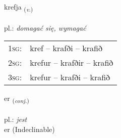\documentclass[frontgrid, backgrid]{flacards}\usepackage[]{graphicx}\usepackage[]{xcolor}
\begin{document}
\renewcommand{\flhead}{\vskip5pt \fboxsep=0pt {\small\bfseries\footnotesize Sagnorð | czasownik}}
\renewcommand{\fcfoot}{\vskip5pt \fboxsep=0pt \hspace{2pt}{\small\bfseries\footnotesize 1K}}

\renewcommand{\blhead}{\vskip5pt {\small\bfseries\footnotesize Sagnorð | czasownik }}
\renewcommand{\bcfoot}{\vskip5pt \hspace{2pt}{\small\bfseries\footnotesize 1K}}


{krefja \small{\textsubscript{(\textit{v.})}} \\[1ex] %
\textphonetic{[kʰrɛvja]} \\
pl.: \emph{domagać się, wymagać} \\  [2ex]
\renewcommand*{\arraystretch}{0.8}
\begin{tabular}{p{1cm}l}
\textsc{1sg}: & kref -- krafði -- krafið \\ 
\textsc{2sg}: & krefur -- krafðir -- krafið \\ 
\textsc{3sg}: & krefur -- krafði -- krafið \\ 
\end{tabular}
}


\renewcommand{\flhead}{\vskip5pt \fboxsep=0pt {\small\bfseries\footnotesize Samtenging | spójnik}}
\renewcommand{\fcfoot}{\vskip5pt \fboxsep=0pt \hspace{2pt}{\small\bfseries\footnotesize 1K}}

\renewcommand{\blhead}{\vskip5pt {\small\bfseries\footnotesize Samtenging | spójnik }}
\renewcommand{\bcfoot}{\vskip5pt \hspace{2pt}{\small\bfseries\footnotesize 1K}}


{er \small{\textsubscript{(\textit{conj.})}} \\[1ex]
\textphonetic{[ɛr]} \\
pl.: \emph{jest} \\  [2ex]
er (Indeclinable)}

\end{document}
